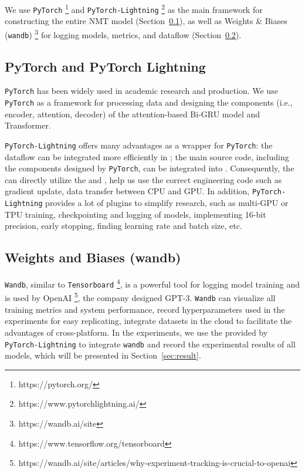 We use \texttt{PyTorch} \footnote{https://pytorch.org/} and \texttt{PyTorch-Lightning} \footnote{https://www.pytorchlightning.ai/} \cite{falcon2019pytorch}  as the main framework for constructing the entire NMT model (Section~\ref{sec:lightning}), as well as Weights \& Biases (\texttt{wandb}) \footnote{https://wandb.ai/site} \cite{wandb} for logging models, metrics, and dataflow (Section~\ref{sec:wandb}).

\subsection{PyTorch and PyTorch Lightning} \label{sec:lightning}

\texttt{PyTorch} has been widely used in academic research and production. We use \texttt{PyTorch} as a framework for processing data and designing the components (i.e., encoder, attention, decoder) of the attention-based Bi-GRU model and Transformer.

\texttt{PyTorch-Lightning} offers many advantages as a wrapper for \texttt{PyTorch}: the dataflow can be integrated more efficiently in ; the main source code, including the components designed by \texttt{PyTorch}, can be integrated into . Consequently, the  can directly utilize the  and , help us use the correct engineering code such as gradient update, data transfer between CPU and GPU. In addition, \texttt{PyTorch-Lightning} provides a lot of plugins to simplify research, such as multi-GPU or TPU training, checkpointing and logging of models, implementing 16-bit precision, early stopping, finding learning rate and batch size, etc.

\subsection{Weights and Biases (wandb)} \label{sec:wandb}

\texttt{Wandb}, similar to \texttt{Tensorboard} \footnote{https://www.tensorflow.org/tensorboard}, is a powerful tool for logging model training and is used by OpenAI \footnote{https://wandb.ai/site/articles/why-experiment-tracking-is-crucial-to-openai}, the company designed GPT-3. \texttt{Wandb} can visualize all training metrics and system performance, record hyperparameters used in the experiments for easy replicating, integrate datasets in the cloud to facilitate the advantages of cross-platform. In the experiments, we use the  provided by \texttt{PyTorch-Lightning} to integrate \texttt{wandb} and record the experimental results of all models, which will be presented in Section~\ref{sec:result}.


